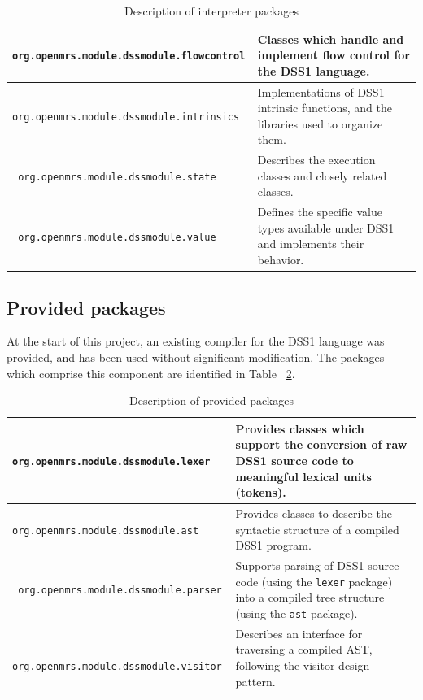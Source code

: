 \documentclass[12pt,letterpaper]{article}
\begin{document}
{\begin{table}
\begin{center}
\begin{tabular}{ >{\tt}l | p{2.5in} }
org.openmrs.module.dssmodule.flowcontrol &
Classes which handle and implement flow control for the 
DSS1 language. \\ \hline
org.openmrs.module.dssmodule.intrinsics &
Implementations of DSS1 intrinsic functions, and the libraries 
used to organize them. \\ \hline
org.openmrs.module.dssmodule.state &
Describes the execution classes and closely related classes. \\ \hline
org.openmrs.module.dssmodule.value &
Defines the specific value types available under DSS1 and 
implements their behavior. \\ \hline
\end{tabular}
\end{center}
\caption{Description of interpreter packages} \label{tab:INTERPRETER_PACKAGES}
\end{table}


\subsection{Provided packages}

At the start of this project, an existing compiler for the DSS1 language 
was provided, and has been used without significant modification. The 
packages which comprise this component are identified in Table 
~\ref{tab:PROVIDED_PACKAGES}.

\begin{table}
\begin{center}
\begin{tabular}{ >{\tt}l | p{3in} }
org.openmrs.module.dssmodule.lexer &
Provides classes which support the conversion of raw DSS1 source code 
to meaningful lexical units (tokens). \\ \hline
org.openmrs.module.dssmodule.ast &
Provides classes to describe the syntactic structure of a compiled 
DSS1 program. \\ \hline
org.openmrs.module.dssmodule.parser &
Supports parsing of DSS1 source code (using the \texttt{lexer} package) into a compiled tree structure (using the \texttt{ast} package). \\ \hline
org.openmrs.module.dssmodule.visitor &
Describes an interface for traversing a compiled AST, following the 
visitor design pattern. \\ \hline
\end{tabular}
\end{center}
\caption{Description of provided packages} \label{tab:PROVIDED_PACKAGES}
\end{table}

}
\end{document}

